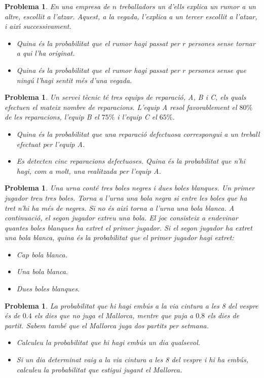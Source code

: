 \documentclass[11pt]{article}
\newcounter{prbcont}
\newtheorem{problema}[prbcont]{Problema}
\begin{document}
\begin{problema}
En una empresa de $n$ treballadors un d'ells explica un rumor a un altre, escollit a l'atzar.
Aquest, a la vegada, l'explica a un tercer escollit a l'atzar, i aix\'{\i} successivament.
\begin{itemize} 
\item [(a)] Quina \'es la probabilitat que el rumor hagi passat per $r$ persones sense tornar a qui
l'ha originat.
\item [(b)] Quina \'es la probabilitat que el rumor hagi passat per $r$ persones sense que ning\'u l'hagi
sentit m\'es d'una vegada.
\end{itemize}
\end{problema}

\begin{problema}
Un servei t\`ecnic t\'e tres equips de reparaci\'o, A, B i C, els quals efectuen el mateix nombre
de reparacions. L'equip A resol favorablement el $80\%$ de les reparacions, l'equip B el $75\%$
i l'equip C el $65\%$.
\begin{itemize}
\item [(a)] Quina \'es la probabilitat que una reparaci\'o defectuosa correspongui a un treball efectuat
per l'equip A.
\item [(b)] Es detecten cinc reparacions defectuoses. Quina \'es la probabilitat que n'hi hagi, com
a molt, una realitzada per l'equip A.
\end{itemize}
\end{problema}

\begin{problema}
Una urna cont\'e tres boles negres i dues boles blanques. Un primer jugador treu tres boles.
Torna a l'urna una bola negra si entre les boles que ha tret n'hi ha m\'es de negres. Si no
\'es aix\'{\i} torna a l'urna una bola blanca. A continuaci\'o, el segon jugador extreu una bola.
El joc consisteix a endevinar quantes boles blanques ha extret el primer jugador. Si el
segon jugador ha extret una bola blanca, quina \'es la probabilitat que el primer jugador
hagi extret:
\begin{itemize}
\item [(a)] Cap bola blanca.
\item [(b)] Una bola blanca.
\item [(c)] Dues boles blanques.
\end{itemize}
\end{problema}

\begin{problema}
La probabilitat que hi hagi emb\'us a la via cintura a les 8 del vespre \'es de $0.4$ els dies que no
juga el Mallorca, mentre que puja a $0.8$ els dies de partit. Sabem tamb\'e que el Mallorca juga
dos partits per setmana.
\begin{itemize}
\item [(a)] Calculeu la probabilitat que hi hagi emb\'us un dia qualsevol.
\item [(b)] Si un dia determinat vaig a la via cintura a les 8 del vespre i hi ha emb\'us, calculeu la
probabilitat que estigui jugant el Mallorca.
\end{itemize}
\end{problema}
\end{document}
